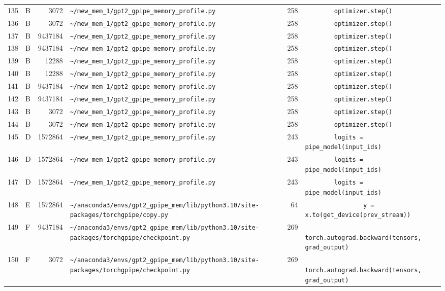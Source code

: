 \documentclass{article}
\begin{document}
\begin{longtable}{r l r p{6.5cm} r p{7.0cm}}
135 & B & 3072 & \lstinline|~/mew_mem_1/gpt2_gpipe_memory_profile.py| & 258 & \lstinline|        optimizer.step()| \\
136 & B & 3072 & \lstinline|~/mew_mem_1/gpt2_gpipe_memory_profile.py| & 258 & \lstinline|        optimizer.step()| \\
137 & B & 9437184 & \lstinline|~/mew_mem_1/gpt2_gpipe_memory_profile.py| & 258 & \lstinline|        optimizer.step()| \\
138 & B & 9437184 & \lstinline|~/mew_mem_1/gpt2_gpipe_memory_profile.py| & 258 & \lstinline|        optimizer.step()| \\
139 & B & 12288 & \lstinline|~/mew_mem_1/gpt2_gpipe_memory_profile.py| & 258 & \lstinline|        optimizer.step()| \\
140 & B & 12288 & \lstinline|~/mew_mem_1/gpt2_gpipe_memory_profile.py| & 258 & \lstinline|        optimizer.step()| \\
141 & B & 9437184 & \lstinline|~/mew_mem_1/gpt2_gpipe_memory_profile.py| & 258 & \lstinline|        optimizer.step()| \\
142 & B & 9437184 & \lstinline|~/mew_mem_1/gpt2_gpipe_memory_profile.py| & 258 & \lstinline|        optimizer.step()| \\
143 & B & 3072 & \lstinline|~/mew_mem_1/gpt2_gpipe_memory_profile.py| & 258 & \lstinline|        optimizer.step()| \\
144 & B & 3072 & \lstinline|~/mew_mem_1/gpt2_gpipe_memory_profile.py| & 258 & \lstinline|        optimizer.step()| \\
145 & D & 1572864 & \lstinline|~/mew_mem_1/gpt2_gpipe_memory_profile.py| & 243 & \lstinline|        logits = pipe_model(input_ids)| \\
146 & D & 1572864 & \lstinline|~/mew_mem_1/gpt2_gpipe_memory_profile.py| & 243 & \lstinline|        logits = pipe_model(input_ids)| \\
147 & D & 1572864 & \lstinline|~/mew_mem_1/gpt2_gpipe_memory_profile.py| & 243 & \lstinline|        logits = pipe_model(input_ids)| \\
148 & E & 1572864 & \lstinline|~/anaconda3/envs/gpt2_gpipe_mem/lib/python3.10/site-packages/torchgpipe/copy.py| & 64 & \lstinline|                y = x.to(get_device(prev_stream))| \\
149 & F & 9437184 & \lstinline|~/anaconda3/envs/gpt2_gpipe_mem/lib/python3.10/site-packages/torchgpipe/checkpoint.py| & 269 & \lstinline|            torch.autograd.backward(tensors, grad_output)| \\
150 & F & 3072 & \lstinline|~/anaconda3/envs/gpt2_gpipe_mem/lib/python3.10/site-packages/torchgpipe/checkpoint.py| & 269 & \lstinline|            torch.autograd.backward(tensors, grad_output)| \\

\end{longtable}
\end{document}
